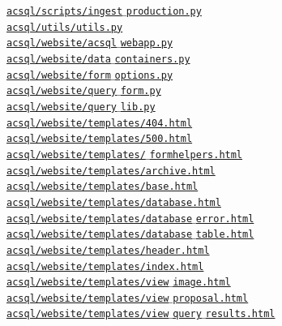 \documentclass[10pt,journal,compsoc]{IEEEtran}
\begin{document}
\noindent \hyperlink{page.53}{\texttt{acsql/scripts/ingest$\_$production.py}} \\
\noindent \hyperlink{page.56}{\texttt{acsql/utils/utils.py}} \\
\noindent \hyperlink{page.59}{\texttt{acsql/website/acsql$\_$webapp.py}} \\
\noindent \hyperlink{page.62}{\texttt{acsql/website/data$\_$containers.py}} \\
\noindent \hyperlink{page.67}{\texttt{acsql/website/form$\_$options.py}} \\
\noindent \hyperlink{page.68}{\texttt{acsql/website/query$\_$form.py}} \\
\noindent \hyperlink{page.72}{\texttt{acsql/website/query$\_$lib.py}} \\
\noindent \hyperlink{page.77}{\texttt{acsql/website/templates/404.html}} \\
\noindent \hyperlink{page.77}{\texttt{acsql/website/templates/500.html}} \\
\noindent \hyperlink{page.77}{\texttt{acsql/website/templates/$\_$formhelpers.html}} \\
\noindent \hyperlink{page.78}{\texttt{acsql/website/templates/archive.html}} \\
\noindent \hyperlink{page.78}{\texttt{acsql/website/templates/base.html}} \\
\noindent \hyperlink{page.79}{\texttt{acsql/website/templates/database.html}} \\
\noindent \hyperlink{page.80}{\texttt{acsql/website/templates/database$\_$error.html}} \\
\noindent \hyperlink{page.80}{\texttt{acsql/website/templates/database$\_$table.html}} \\
\noindent \hyperlink{page.82}{\texttt{acsql/website/templates/header.html}} \\
\noindent \hyperlink{page.82}{\texttt{acsql/website/templates/index.html}} \\
\noindent \hyperlink{page.82}{\texttt{acsql/website/templates/view$\_$image.html}} \\
\noindent \hyperlink{page.84}{\texttt{acsql/website/templates/view$\_$proposal.html}} \\
\noindent \hyperlink{page.85}{\texttt{acsql/website/templates/view$\_$query$\_$results.html}} \\
\end{document}
